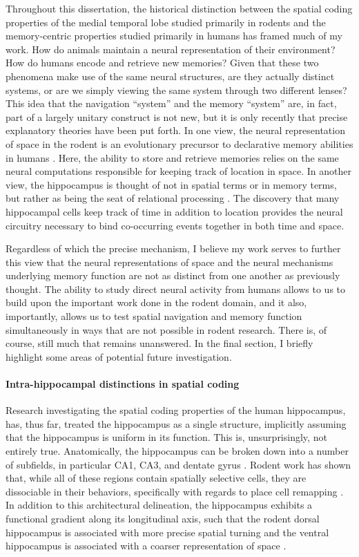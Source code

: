 Throughout this dissertation, the historical distinction between the spatial coding properties of the medial temporal lobe studied primarily in rodents and the memory-centric properties studied primarily in humans has framed much of my work. How do animals maintain a neural representation of their environment? How do humans encode and retrieve new memories? Given that these two phenomena make use of the same neural structures, are they actually distinct systems, or are we simply viewing the same system through two different lenses? This idea that the navigation ``system'' and the memory ``system'' are, in fact, part of a largely unitary construct is not new, but it is only recently that precise explanatory theories have been put forth. In one view, the neural representation of space in the rodent is an evolutionary precursor to declarative memory abilities in humans \citep{BuzsMose13}. Here, the ability to store and retrieve memories relies on the same neural computations responsible for keeping track of location in space. In another view, the hippocampus is thought of not in spatial terms or in memory terms, but rather as being the seat of relational processing \citep{CoheEich93,Eich14}. The discovery that many hippocampal cells keep track of time in addition to location \citep{MacDEtal11,PastEtal08} provides the neural circuitry necessary to bind co-occurring events together in both time and space.

Regardless of which the precise mechanism, I believe my work serves to further this view that the neural representations of space and the neural mechanisms underlying memory function are not as distinct from one another as previously thought. The ability to study direct neural activity from humans allows to us to build upon the important work done in the rodent domain, and it also, importantly, allows us to test spatial navigation and memory function simultaneously in ways that are not possible in rodent research. There is, of course, still much that remains unanswered. In the final section, I briefly highlight some areas of potential future investigation.

\paragraph{Intra-hippocampal distinctions in spatial coding}
Research investigating the spatial coding properties of the human hippocampus, has, thus far, treated the hippocampus as a single structure, implicitly assuming that the hippocampus is uniform in its function. This is, unsurprisingly, not entirely true. Anatomically, the hippocampus can be broken down into a number of subfields, in particular CA1, CA3, and dentate gyrus \citep{AndeEtal06}. Rodent work has shown that, while all of these regions contain spatially selective cells, they are dissociable in their behaviors, specifically with regards to place cell remapping \citep{LeutEtal04,LeutEtal05a,LeutEtal07}. In addition to this architectural delineation, the hippocampus exhibits a functional gradient along its longitudinal axis, such that the rodent dorsal hippocampus is associated with more precise spatial turning and the ventral hippocampus is associated with a coarser representation of space \citep{KjelEtal08,StraEtal14}.

